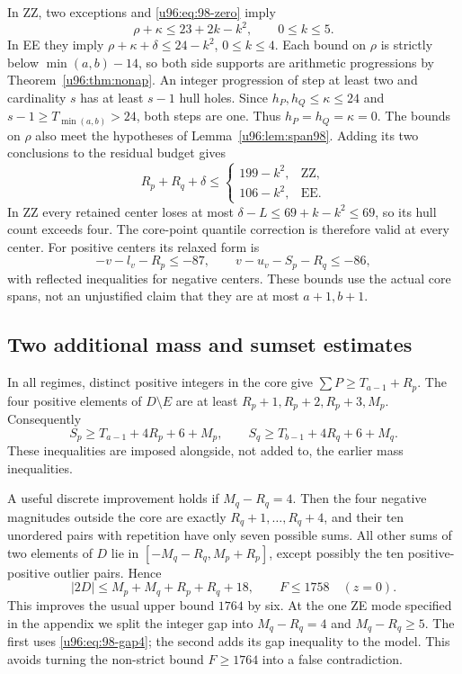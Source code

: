 \documentclass[11pt,a4paper]{article}
\theoremstyle{remark}
\begin{document}
In ZZ, two exceptions and \eqref{u96:eq:98-zero} imply
\[
 \rho+\kappa\leq23+2k-k^2,\qquad 0\leq k\leq5.
\]
In EE they imply $\rho+\kappa+\delta\leq24-k^2$, $0\leq k\leq4$.
Each bound on $\rho$ is strictly below $\min(a,b)-14$, so both side
supports are arithmetic progressions by Theorem~\ref{u96:thm:nonap}.
An integer progression of step at least two and cardinality $s$ has at
least $s-1$ hull holes. Since $h_P,h_Q\leq\kappa\leq24$ and
$s-1\geq T_{\min(a,b)}>24$, both steps are one. Thus
$h_P=h_Q=\kappa=0$. The bounds on $\rho$ also meet the hypotheses of
Lemma~\ref{u96:lem:span98}. Adding its two conclusions to the residual budget
gives
\begin{equation}
 R_p+R_q+\delta\leq
 \begin{cases}
 199-k^2,&\text{ZZ},\\
 106-k^2,&\text{EE}.
 \end{cases}\label{u96:eq:98-span-budget}
\end{equation}
In ZZ every retained center loses at most
$\delta-L\leq69+k-k^2\leq69$, so its hull count exceeds four.
The core-point quantile correction is therefore valid at every center.
For positive centers its relaxed form is
\[
 -v-l_v-R_p\leq-87,\qquad
 v-u_v-S_p-R_q\leq-86,
\]
with reflected inequalities for negative centers. These bounds use the
actual core spans, not an unjustified claim that they are at most $a+1,b+1$.

\subsection{Two additional mass and sumset estimates}
In all regimes, distinct positive integers in the core give
$\sum P\geq T_{a-1}+R_p$. The four positive elements of $D\setminus E$
are at least $R_p+1,R_p+2,R_p+3,M_p$. Consequently
\begin{equation}
 S_p\geq T_{a-1}+4R_p+6+M_p,
 \qquad S_q\geq T_{b-1}+4R_q+6+M_q.
 \label{u96:eq:98-strong-mass}
\end{equation}
These inequalities are imposed alongside, not added to, the earlier
mass inequalities.

A useful discrete improvement holds if $M_q-R_q=4$.
Then the four negative magnitudes outside the core are exactly
$R_q+1,\ldots,R_q+4$, and their ten unordered pairs with repetition
have only seven possible sums. All other sums of two elements of $D$
lie in $[-M_q-R_q,M_p+R_p]$, except possibly the ten positive-positive
outlier pairs. Hence
\begin{equation}
 |2D|\leq M_p+M_q+R_p+R_q+18,
 \qquad F\leq1758\quad(z=0).
 \label{u96:eq:98-gap4}
\end{equation}
This improves the usual upper bound $1764$ by six. At the one ZE mode
specified in the appendix we split the integer gap into $M_q-R_q=4$
and $M_q-R_q\geq5$. The first uses \eqref{u96:eq:98-gap4}; the second adds
its gap inequality to the model. This avoids turning the non-strict
bound $F\geq1764$ into a false contradiction.
\end{document}
